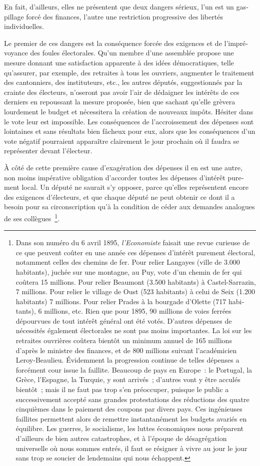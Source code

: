\documentclass[french,twoside]{book} %
\begin{document}
En fait, d’ailleurs, elles ne présentent que deux dangers sérieux, l’un est un gas­pillage forcé des finances, l’autre une restriction progressive des libertés individuelles.\par
Le premier de ces dangers est la conséquence forcée des exigences et de l’impré­voyance des foules électorales. Qu’un membre d’une assemblée propose une mesure donnant une satisfaction apparente à des idées démocratiques, telle qu’assurer, par exemple, des retraites à tous les ouvriers, augmenter le traitement des cantonniers, des instituteurs, etc., les autres députés, suggestionnés par la crainte des électeurs, n’oseront pas avoir l’air de dédaigner les intérêts de ces derniers en repoussant la mesure proposée, bien que sachant qu’elle grèvera lourdement le budget et nécessitera la création de nouveaux impôts. Hésiter dans le vote leur est impossible. Les consé­quences de l’accroissement des dépenses sont lointaines et sans résultats bien fâcheux pour eux, alors que les conséquences d’un vote négatif pourraient apparaître claire­ment le jour prochain où il faudra se représenter devant l’électeur.\par
À côté de cette première cause d’exagération des dépenses il en est une autre, non moins impérative obligation d’accorder toutes les dépenses d’intérêt pure­ment local. Un député ne saurait s’y opposer, parce qu’elles représentent encore des exigences d’électeurs, et que chaque député ne peut obtenir ce dont il a besoin pour sa circons­cription qu’à la condition de céder aux demandes analogues de ses collègues \footnote{Dans son numéro du 6 avril 1895, \emph{l’Economiste} faisait une revue curieuse de ce que peuvent coûter en une année ces dépenses d’intérêt purement électoral, notamment celles des chemins de fer. Pour relier Langayes (ville de 3.000 habi­tants), juchée sur une montagne, au Puy, vote d’un chemin de fer qui coûtera 15 millions. Pour relier Beaumont (3.500 ha­bitants) à Castel-Sarrazin, 7 millions. Pour relier le village de Oust (523 habitants) à celui de Seix (1.200 habitants) 7 mil­lions. Pour relier Prades à la bourgade d’Olette (717 habi­tants), 6 millions, etc. Rien que pour 1895, 90 millions de voies ferrées dépourvues de tout intérêt général ont été votés. D’autres dépenses de nécessités également électorales ne sont pas moins importantes. La loi sur les retraites ouvrières coûtera bientôt un minimum annuel de 165 millions d’après le ministre des finances, et de 800 millions suivant l’académi­cien Leroy-Beaulieu. Évidemment la progression continue de telles dépenses a forcément cour issue la faillite. Beaucoup de pays en Europe : le Portugal, la Grèce, l’Espagne, la Turquie, y sont arrivés ; d’autres vont y être acculés bientôt ; mais il ne faut pas trop s’en préoccuper, puisque le public a successivement accepté sans grandes protes­tations des réductions des quatre cinquièmes dans le paie­ment des coupons par divers pays. Ces ingénieuses faillites permettent alors de remettre instantanément les budgets avariés en équilibre. Les guerres, le socialisme, les luttes économiques nous préparent d’ailleurs de bien autres catastrophes, et à l’époque de désagrégation universelle où nous sommes entrés, il faut se résigner à vivre au jour le jour sans trop se soucier de lendemains qui nous échappent.}.\par
\end{document}

